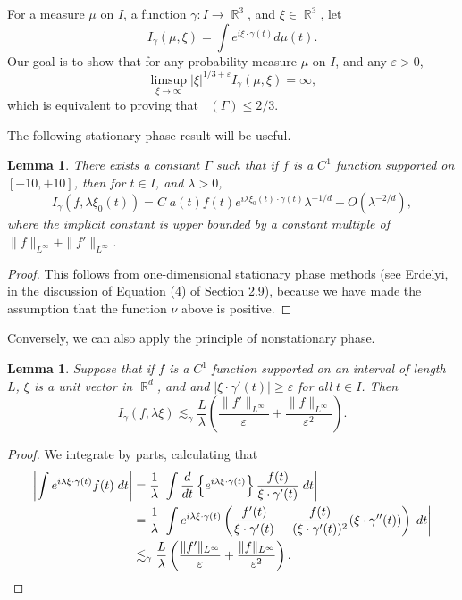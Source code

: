 \documentclass[dvipsnames,letterpaper,12pt]{article}
\DeclareMathOperator{\fordim}{\dim_{\mathbb{F}}}
\DeclareMathOperator{\RR}{\mathbb{R}}
\newtheorem{lemma}[theorem]{Lemma}
\begin{document}
For a measure $\mu$ on $I$, a function $\gamma: I \to \RR^3$, and $\xi \in \RR^3$, let
%
\[ I_\gamma(\mu,\xi) = \int e^{i \xi \cdot \gamma(t)} d\mu(t). \]
%
Our goal is to show that for any probability measure $\mu$ on $I$, and any $\varepsilon > 0$,
%
\[ \limsup_{\xi \to \infty} |\xi|^{1/3 + \varepsilon} I_\gamma(\mu,\xi) = \infty, \]
%
which is equivalent to proving that $\fordim(\Gamma) \leq 2/3$.

The following stationary phase result will be useful.

\begin{lemma}
    There exists a constant $\Gamma$ such that if $f$ is a $C^1$ function supported on $[-10,+10]$, then for $t \in I$, and $\lambda > 0$,
    \[ I_\gamma(f, \lambda \xi_0(t)) = C\; a(t) f(t) e^{i \lambda \xi_0(t) \cdot \gamma(t)} \lambda^{-1/d} + O(\lambda^{-2/d}), \]
    where the implicit constant is upper bounded by a constant multiple of $\| f \|_{L^\infty} + \| f' \|_{L^\infty}$.
\end{lemma}
\begin{proof}
    This follows from one-dimensional stationary phase methods (see Erdelyi, in the discussion of Equation (4) of Section 2.9), because we have made the assumption that the function $\nu$ above is positive.
\end{proof}

Conversely, we can also apply the principle of nonstationary phase.

\begin{lemma}
    Suppose that if $f$ is a $C^1$ function supported on an interval of length $L$, $\xi$ is a unit vector in $\RR^d$, and and $|\xi \cdot \gamma'(t)| \geq \varepsilon$ for all $t \in I$. Then
    \[ I_\gamma(f, \lambda \xi) \lesssim_\gamma \frac{L}{\lambda} \left( \frac{\| f' \|_{L^\infty}}{\varepsilon} + \frac{\| f \|_{L^\infty}}{\varepsilon^2} \right). \]
\end{lemma}
\begin{proof}
    We integrate by parts, calculating that
    \begin{align*}
        \left| \int e^{i \lambda \xi \cdot \gamma(t)} f(t)\; dt \right| &= \frac{1}{\lambda} \left| \int \frac{d}{dt} \left\{ e^{i \lambda \xi \cdot \gamma(t)} \right\} \frac{f(t)}{\xi \cdot \gamma'(t)}\; dt \right|\\
        &= \frac{1}{\lambda} \left| \int e^{i \lambda \xi \cdot \gamma(t)} \left( \frac{f'(t)}{\xi \cdot \gamma'(t)} - \frac{f(t)}{(\xi \cdot \gamma'(t))^2} (\xi \cdot \gamma''(t)) \right)\; dt \right|\\
        &\lesssim_\gamma \frac{L}{\lambda} \left( \frac{\| f' \|_{L^\infty}}{\varepsilon} + \frac{\| f \|_{L^\infty}}{\varepsilon^2} \right). \qedhere
    \end{align*}
\end{proof}
\end{document}

